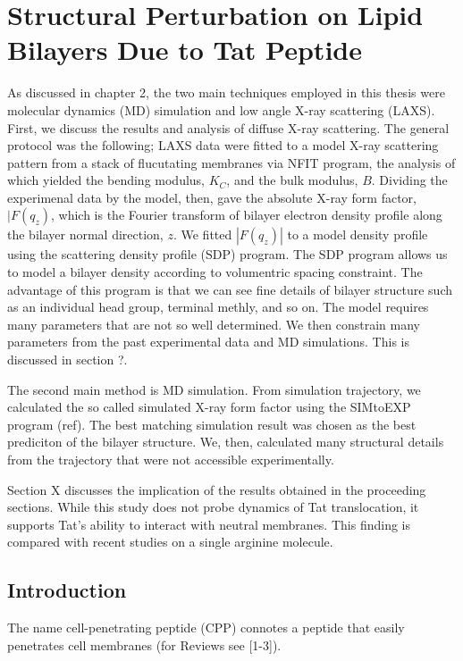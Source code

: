 \chapter{Structural Perturbation on Lipid Bilayers Due to Tat Peptide}
As discussed in chapter 2, the two main techniques employed in this thesis 
were molecular dynamics (MD) simulation and low angle X-ray scattering (LAXS).
First, we discuss the results and analysis of diffuse X-ray scattering. The
general protocol was the following; LAXS data were fitted to a model X-ray
scattering pattern from a stack of flucutating membranes via NFIT program,
the analysis of which yielded the bending modulus, $K_C$, and the bulk
modulus, $B$. Dividing the experimenal data by the model, then, gave the 
absolute X-ray form factor, $|F(q_z)$, which is the Fourier transform
of bilayer electron density profile along the bilayer normal direction, $z$. 
We fitted $|F(q_z)|$ to a model density profile using the scattering density
profile (SDP) program. The SDP program allows us to model a bilayer density
according to volumentric spacing constraint. The advantage of this program is
that we can see fine details of bilayer structure such as an individual
head group, terminal methly, and so on. The model requires many parameters
that are not so well determined. We then constrain many parameters from
the past experimental data and MD simulations. This is discussed in 
section ?.

The second main method is MD simulation. From simulation trajectory, we 
calculated the so called simulated X-ray form factor using the SIMtoEXP
program (ref). The best matching simulation result was chosen as the best
prediciton of the bilayer structure. We, then, calculated many structural
details from the trajectory that were not accessible experimentally.   

Section X discusses the implication of the results obtained in the proceeding 
sections. While this study does not probe dynamics of Tat translocation,
it supports Tat's ability to interact with neutral membranes. This finding
is compared with recent studies on a single arginine molecule.

\section{Introduction}
The name cell-penetrating peptide (CPP) connotes a peptide that 
easily penetrates cell membranes (for Reviews see [1-3]). 

